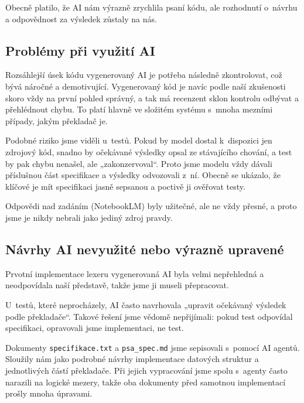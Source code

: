 \documentclass[a4paper,11pt]{article}
\begin{document}
Obecně platilo, že AI nám výrazně zrychlila psaní kódu, ale rozhodnutí
o~návrhu a odpovědnost za výsledek zůstaly na nás.

\subsection{Problémy při využití AI}
Rozsáhlejší úsek kódu vygenerovaný AI je potřeba následně zkontrolovat, což
bývá náročné a demotivující. Vygenerovaný kód je navíc podle naší zkušenosti
skoro vždy na první pohled správný, a tak má recenzent sklon kontrolu
odbývat a přehlédnout chybu. To platí hlavně ve složitém systému s~mnoha
mezními případy, jakým překladač je.

Podobné riziko jsme viděli u~testů. Pokud by model dostal k~dispozici jen
zdrojový kód, snadno by očekávané výsledky opsal ze stávajícího chování,
a test by pak chybu nenašel, ale „zakonzervoval“. Proto jsme modelu vždy
dávali příslušnou část specifikace a výsledky odvozovali z~ní. Obecně se
ukázalo, že klíčové je mít specifikaci jasně sepsanou a poctivě ji ověřovat
testy.

Odpovědi nad zadáním (NotebookLM) byly užitečné, ale ne vždy přesné, a proto
jsme je nikdy nebrali jako jediný zdroj pravdy.

\subsection{Návrhy AI nevyužité nebo výrazně upravené}
Prvotní implementace lexeru vygenerovaná AI byla velmi nepřehledná
a neodpovídala naší představě, takže jsme ji museli přepracovat.

U~testů, které neprocházely, AI často navrhovala „upravit očekávaný
výsledek podle překladače“. Takové řešení jsme vědomě nepřijímali:
pokud test odpovídal specifikaci, opravovali jsme implementaci, ne test.

Dokumenty \texttt{specifikace.txt} a \texttt{psa\_spec.md} jsme
sepisovali s~pomocí AI agentů. Sloužily nám jako podrobné návrhy
implementace datových struktur a jednotlivých částí překladače.
Při jejich vypracování jsme spolu s~agenty často narazili na logické
mezery, takže oba dokumenty před samotnou implementací prošly mnoha
úpravami.

\end{document}
